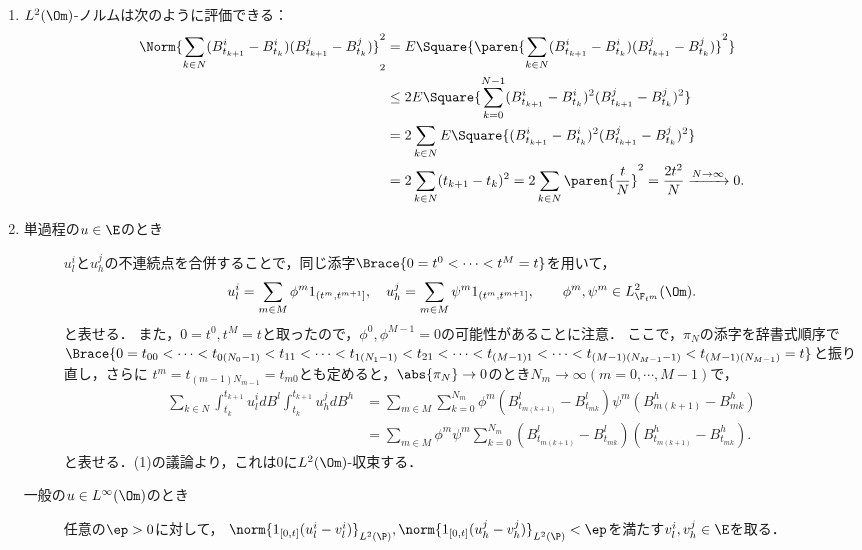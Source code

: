 \documentclass[uplatex,dvipdfmx]{jsreport}
\begin{document}
\begin{Proof}\mbox{}
    \begin{enumerate}
        \item $L^2(\Om)$-ノルムは次のように評価できる：
        \begin{align*}
            \Norm{\sum_{k\in N}(B^i_{t_{k+1}}-B^i_{t_k})(B^j_{t_{k+1}}-B^j_{t_k})}_2^2&=E\Square{\paren{\sum_{k\in N}(B^i_{t_{k+1}}-B^i_{t_k})(B^j_{t_{k+1}}-B^j_{t_k})}^2}\\
            &\le 2E\Square{\sum_{k=0}^{N-1}(B_{t_{k+1}}^i-B_{t_k}^i)^2(B_{t_{k+1}}^j-B_{t_k}^j)^2}\\
            &=2\sum_{k\in N}E\Square{(B_{t_{k+1}}^i-B_{t_k}^i)^2(B_{t_{k+1}}^j-B_{t_k}^j)^2}\\
            &=2\sum_{k\in N}(t_{k+1}-t_k)^2=2\sum_{k\in N}\paren{\frac{t}{N}}^2=\frac{2t^2}{N}\xrightarrow{N\to\infty}0.
        \end{align*}
        \item \begin{description}
            \item[単過程の$u\in\E$のとき] $u^i_l$と$u^j_h$の不連続点を合併することで，同じ添字$\Brace{0=t^0<\cdots<t^M=t}$を用いて，
            \[u^i_l=\sum_{m\in M}\phi^m1_{(t^m,t^{m+1}]},\quad u^j_h=\sum_{m\in M}\psi^m1_{(t^m,t^{m+1}]},\qquad\phi^m,\psi^m\in L^2_{\F_{t^m}}(\Om).\]
            と表せる．
            また，$0=t^0,t^M=t$と取ったので，$\phi^0,\phi^{M-1}=0$の可能性があることに注意．
            ここで，$\pi_N$の添字を辞書式順序で$\Brace{0=t_{00}<\cdots<t_{0(N_0-1)}<t_{11}<\cdots<t_{1(N_1-1)}<t_{21}<\cdots<t_{(M-1)1}<\cdots<t_{(M-1)(N_{M-1}-1)}<t_{(M-1)(N_{M-1})}=t}$と振り直し，さらに
            $t^m=t_{(m-1)N_{m-1}}=t_{m0}$とも定めると，$\abs{\pi_N}\to0$のとき$N_m\to\infty(m=0,\cdots,M-1)$で，
            \begin{align*}
                \sum_{k\in N}\int^{t_{k+1}}_{t_k}u^i_ldB^l\int^{t_{k+1}}_{t_k}u^j_hdB^h&=\sum_{m\in M}\sum_{k=0}^{N_m}\phi^m(B^l_{t_{m(k+1)}}-B^l_{t_{mk}})\psi^m(B^h_{m(k+1)}-B^h_{mk})\\
                &=\sum_{m\in M}\phi^m\psi^m\sum_{k=0}^{N_m}(B^l_{t_{m(k+1)}}-B^l_{t_{mk}})(B^h_{t_{m(k+1)}}-B^h_{t_{mk}}).
            \end{align*}
            と表せる．(1)の議論より，これは$0$に$L^2(\Om)$-収束する．
            \item[一般の$u\in L^\infty(\Om)$のとき] 任意の$\ep>0$に対して，
            $\norm{1_{[0,t]}(u^i_l-v^i_l)}_{L^2(\P)},\norm{1_{[0,t]}(u^j_h-v^j_h)}_{L^2(\P)}<\ep$を満たす$v^i_l,v^j_h\in\E$を取る．

\end{description}
\end{enumerate}
\end{Proof}
\end{document}
